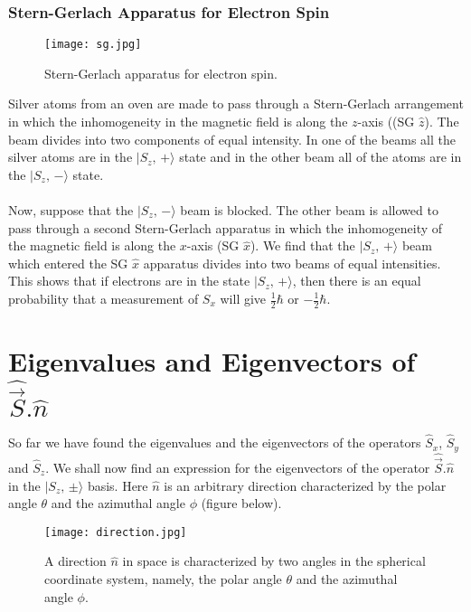\newpage

\subsubsection{Stern-Gerlach Apparatus for Electron Spin}

\begin{figure}[ht]
	\centering
	\texttt{[image: sg.jpg]}
	\caption{Stern-Gerlach apparatus for electron spin. }
	\label{sg}
\end{figure}

Silver atoms from an oven are made to pass through a Stern-Gerlach arrangement in which the inhomogeneity in the magnetic field is 
along the $z$-axis ((SG $\hat{z}$). The beam divides into two components of equal intensity. In one of the beams all the silver atoms are in the $|S_z,\, +\rangle$ state and in the other beam all of the atoms are in the $|S_z,\,-\rangle$ state. 

\paragraph{}
Now, suppose that the $|S_z,\,-\rangle$ beam is blocked. The other beam is allowed to pass through a second Stern-Gerlach apparatus in which the inhomogeneity of the magnetic field is along the $x$-axis (SG $\hat{x}$). We find that the $|S_z,\,+\rangle$
beam which entered the SG $\hat{x}$ apparatus divides into two beams of equal intensities. This shows that if electrons are in  the state  $|S_z,\,+ \rangle$, then there is an equal probability that a
measurement of $S_x$ will give $\frac{1}{2}\hbar$ or $-\frac{1}{2}\hbar$.

\newpage

\section{Eigenvalues and Eigenvectors of \texorpdfstring{$\hat{\vec{S}}. \hat{n}$}{PDFstring} }
So far we have found the eigenvalues and the eigenvectors of the operators $\hat{S}_x$, $\hat{S}_y$ and
$\hat{S}_z$. We shall now find an expression for the eigenvectors of the operator $\hat{\vec{S}}.\hat{n}$ in the 
$|S_z,\, \pm\rangle$ basis. Here $\hat{n}$ is an arbitrary direction characterized by the polar angle $\theta$ and the azimuthal angle $\phi$ (figure below).
\begin{figure}[h]
	\centering
	\texttt{[image: direction.jpg]}
	\vspace{-0.5 cm}
	\caption{A direction $\hat{n}$ in space is characterized by two angles in the spherical coordinate system, namely, the polar angle
		$\theta$ and the azimuthal angle $\phi$. }
	\label{fig:direction}
\end{figure}

